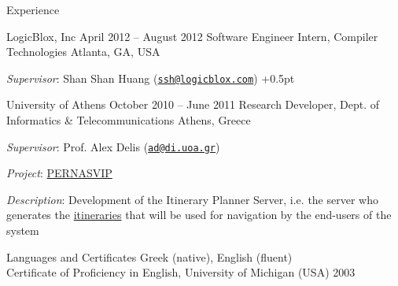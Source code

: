 \documentclass{resume}
\begin{document}
\begin{rSection}{Experience}
\begin{rSubsection}{LogicBlox, Inc}
  {April 2012 -- August 2012}
  {Software Engineer Intern, Compiler Technologies}
  {Atlanta, GA, USA}
\item \emph{Supervisor}: Shan Shan Huang
  (\href{mailto:ssh@logicblox.com}{\nolinkurl{ssh@logicblox.com}})
\itemsep +0.5pt %
\end{rSubsection}

\begin{rSubsection}
  {University of Athens}
  {October 2010 -- June 2011}
  {Research Developer, Dept. of Informatics \& Telecommunications}
  {Athens, Greece}
\item \emph{Supervisor}: Prof. Alex Delis
  (\href{mailto:ad@di.uoa.gr}{\nolinkurl{ad@di.uoa.gr}})
\item \emph{Project}: \href{http://pernasvip.di.uoa.gr/index.php}{PERNASVIP}
\item \emph{Description}: Development of the Itinerary Planner Server,
  i.e. the server who generates the
  \href{http://pernasvip.di.uoa.gr/index.php/gen-spef/itinerary-example}{itineraries}
  that will be used for navigation by the end-users of the system
\end{rSubsection}

\end{rSection}

\newpage

\begin{rSection}{Languages and Certificates}
  Greek (native), English (fluent) \\
  Certificate of Proficiency in English, University of Michigan (USA)
  \hfill 2003
\end{rSection}
\end{document}
